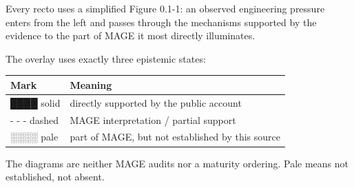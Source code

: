 Every recto uses a simplified Figure 0.1-1: an observed engineering pressure enters from the left and passes through the mechanisms supported by the evidence to the part of MAGE it most directly illuminates.

The overlay uses exactly three epistemic states:

{\footnotesize
{\def\LTcaptype{none} %
\begin{longtable}[]{@{}ll@{}}
\toprule\noalign{}
Mark & Meaning \\
\midrule\noalign{}
\endhead
\bottomrule\noalign{}
\endlastfoot
████ solid & directly supported by the public account \\
- - - dashed & MAGE interpretation / partial support \\
░░░░ pale & part of MAGE, but not established by this source \\
\end{longtable}
}
}

The diagrams are neither MAGE audits nor a maturity ordering. Pale means not established, not absent.
